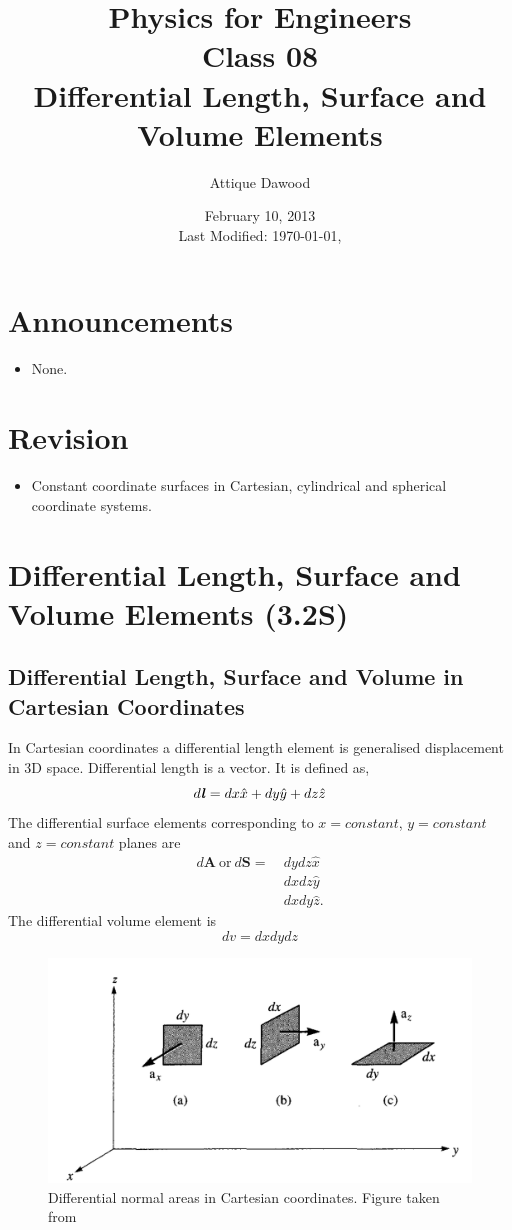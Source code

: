 \documentclass[12pt,a4paper]{article}
\title{\vspace{-2cm}Physics for Engineers\\Class 08\\Differential Length, Surface and Volume Elements}
\author{Attique Dawood}
\date{February 10, 2013\\[0.2cm] Last Modified: \today, \currenttime}
\begin{document}
\maketitle
\section{Announcements}
\begin{itemize}
\item None.
\end{itemize}
\section{Revision}
\begin{itemize}
\item Constant coordinate surfaces in Cartesian, cylindrical and spherical coordinate systems.
\end{itemize}
\section{Differential Length, Surface and Volume Elements (3.2S)}
\subsection{Differential Length, Surface and Volume in Cartesian Coordinates}
In Cartesian coordinates a differential length element is generalised displacement in 3D space. Differential length is a vector. It is defined as,
\begin{equation}
d\textbf{\textit{l}}=dx\hat x+dy\hat y+dz\hat z
\end{equation}
The differential surface elements corresponding to $x=constant$, $y=constant$ and $z=constant$ planes are
\begin{equation}
\begin{split}
d\textbf{A}~\mathrm{or}~d\textbf{S}=~&dydz\hat x\\
&dxdz\hat y\\
&dxdy\hat z.
\end{split}
\end{equation}
The differential volume element is
\begin{equation}
dv=dxdydz
\end{equation}
\begin{figure}[H]
\centering
\includegraphics[scale=0.3]{Figure3-2S.png}
\caption{Differential normal areas in Cartesian coordinates. Figure taken from~\cite[Figure 3.2, page 54]{Sadiku}}
\label{Cartesian-differential-area}
\end{figure}
\end{document}
